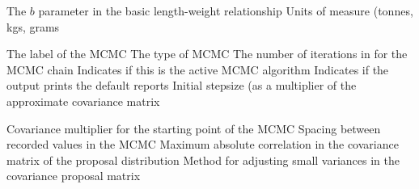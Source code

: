  {The $b$ parameter in the basic length-weight relationship}
 {Units of measure (tonnes, kgs, grams}
\par\textbf{}\par
{}\par\par
\par\textbf{}\par
\par\textbf{}\par
\par\textbf{}\par
\par\textbf{}\par
\par\textbf{}\par
\par\textbf{}\par
\par\textbf{}\par
\par\textbf{}\par
{}\par\par
{} {The label of the MCMC}
 {The type of MCMC}
 {The number of iterations in for the MCMC chain}
 {Indicates if this is the active MCMC algorithm}
 {Indicates if the output prints the default reports}
 {Initial stepsize (as a multiplier of the approximate covariance matrix}
\par\textbf{}\par
{} {Covariance multiplier for the starting point of the MCMC}
 {Spacing between recorded values in the MCMC}
 {Maximum absolute correlation in the covariance matrix of the proposal distribution}
 {Method for adjusting small variances in the covariance proposal matrix}
